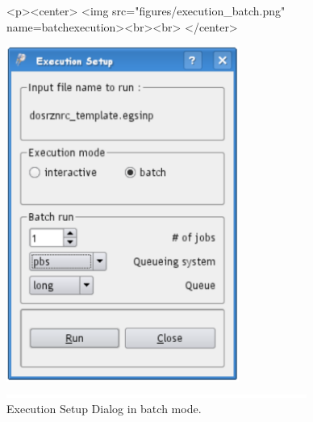 \documentclass[12pt,twoside]{article}   %
\begin{document}
\begin{figure}[h]
\begin{htmlonly}
\begin{rawhtml}
<p><center>
<img src="figures/execution_batch.png" name=batchexecution><br><br>
</center>
\end{rawhtml}
\end{htmlonly}
\begin{latexonly}
\begin{center}
\includegraphics[height=11cm]{figures/execution_batch}
\end{center}
\end{latexonly}
\begin{center}
\includegraphics[height=1mm]{figures/fake2}
\end{center}
\caption{Execution Setup Dialog in batch mode.}
\label{batchexecution}
\end{figure}

\clearpage
\end{document}
